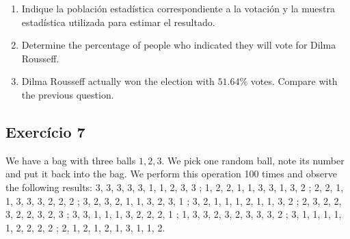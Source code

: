 \begin{enumerate}
\item Indique la población estadística correspondiente a la votación y la
  muestra estadística utilizada para estimar el resultado.
\item Determine the percentage of people who indicated they will vote for Dilma
  Rousseff.
\item Dilma Rousseff actually won the election with $51.64\%$ votes. Compare
  with the previous question.
\end{enumerate}

\subsection*{Exercício 7}

We have a bag with three balls $1,2,3$. We pick one random ball, note its
number and put it back into the bag. We perform this operation 100 times and
observe the following results:
3, 3, 3, 3, 3, 1, 1, 2, 3, 3 ;
1, 2, 2, 1, 1, 3, 3, 1, 3, 2 ;
2, 2, 1, 1, 3, 3, 3, 2, 2, 2 ;
3, 2, 3, 2, 1, 1, 3, 2, 3, 1 ;
3, 2, 1, 1, 1, 2, 1, 1, 3, 2 ;
2, 3, 2, 2, 3, 2, 2, 3, 2, 3 ;
3, 3, 1, 1, 1, 3, 2, 2, 2, 1 ;
1, 3, 3, 2, 3, 2, 3, 3, 3, 2 ;
3, 1, 1, 1, 1, 1, 2, 2, 2, 2 ;
2, 1, 2, 1, 2, 1, 3, 1, 1, 2.

